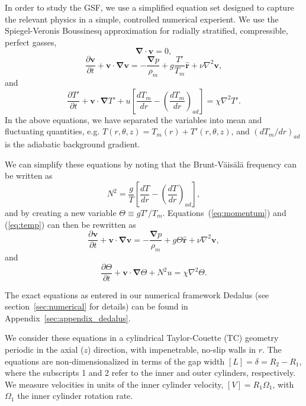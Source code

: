 \documentclass{jfm}
\begin{document}
In order to study the GSF, we use a simplified equation set designed
to capture the relevant physics in a simple, controlled numerical
experient. We use the Spiegel-Veronis Boussinesq approximation for
radially stratified, compressible, perfect gasses,
\begin{equation}
  \label{eq:continuity}
  \mathbf{\nabla \cdot v} = 0,
\end{equation}
\begin{equation}
  \label{eq:momentum}
  \frac{\partial \mathbf{v}}{\partial t} + \mathbf{v \cdot \nabla v} = -\frac{\mathbf{\nabla} p}{\rho_m} + g \frac{T'}{T_m}\mathbf{\hat{r}} + \nu \nabla^2 \mathbf{v},
\end{equation}
and
\begin{equation}
  \label{eq:temp}
  \frac{\partial T'}{\partial t} + \mathbf{v \cdot \nabla} T' + u \left[\frac{d T_m}{dr} - \left(\frac{d T_m}{dr}\right)_{ad}\right] = \chi \nabla^2 T'.
\end{equation}
In the above equations, we have separated the variables into mean and
fluctuating quantities, e.g. $T(r, \theta, z) = T_m(r) + T'(r, \theta, z)$, and $(d T_m/dr)_{ad}$ is the
adiabatic background gradient.

We can simplify these equations by noting that the Brunt-V\"ais\"al\"a frequency can be written as
\begin{equation}
  \label{eq:brunt}
  N^2 = \frac{g}{T}\left[\frac{d T}{dr} - \left(\frac{d T}{dr}\right)_{ad}\right],
\end{equation}
and by creating a new variable $\Theta \equiv g T'/T_m$. Equations~(\ref{eq:momentum}) and (\ref{eq:temp}) can then be rewritten as 
\begin{equation}
  \label{eq:final_momentum}
  \frac{\partial \mathbf{v}}{\partial t} + \mathbf{v \cdot \nabla v} = -\frac{\mathbf{\nabla} p}{\rho_m} + g \Theta \mathbf{\hat{r}} + \nu \nabla^2 \mathbf{v},
\end{equation}
and
\begin{equation}
  \label{eq:final_temp}
  \frac{\partial \Theta}{\partial t} + \mathbf{v \cdot \nabla} \Theta + N^2 u = \chi \nabla^2 \Theta.
\end{equation}

The exact equations as entered in our numerical framework Dedalus (see
section~\ref{sec:numerical} for details) can be found in
Appendix~\ref{sec:appendix_dedalus}.

We consider these equations in a cylindrical Taylor-Couette (TC) geometry
periodic in the axial ($z$) direction, with impenetrable, no-slip
walls in $r$. The equations are non-dimensionalized in terms of the
gap width $[L] = \delta = R_2 -R_1$, where the subscripts 1 and 2
refer to the inner and outer cylinders, respectively. We measure
velocities in units of the inner cylinder velocity,
$[V] = R_1 \Omega_1$, with $\Omega_1$ the inner cylinder rotation
rate. 
\end{document}
